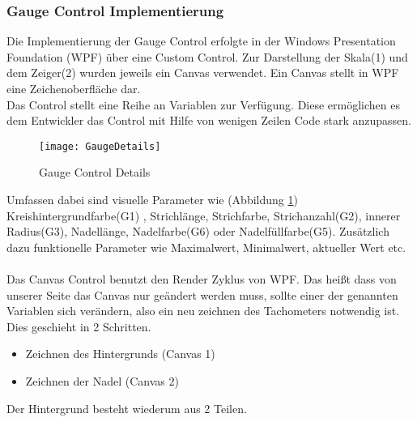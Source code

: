 \subsubsection{Gauge Control Implementierung}

Die Implementierung der Gauge Control erfolgte in der Windows Presentation Foundation (WPF) über eine Custom Control. Zur Darstellung der Skala(1) und dem Zeiger(2) wurden jeweils ein Canvas verwendet. Ein Canvas stellt in WPF eine Zeichenoberfläche dar.\\



Das Control stellt eine Reihe an Variablen zur Verfügung. Diese ermöglichen es dem Entwickler das Control mit Hilfe von wenigen Zeilen Code stark anzupassen. 
\begin{figure}[ht]
	\centering
	\texttt{[image: GaugeDetails]}
	\caption{Gauge Control Details}
	\label{fig:gauge1}
\end{figure}
Umfassen dabei sind visuelle Parameter wie (Abbildung \ref{fig:gauge1}) Kreishintergrundfarbe(G1) , Strichlänge, Strichfarbe, Strichanzahl(G2), innerer Radius(G3), Nadellänge, Nadelfarbe(G6) oder Nadelfüllfarbe(G5). Zusätzlich dazu funktionelle Parameter wie Maximalwert, Minimalwert, aktueller Wert etc.\\\\

Das Canvas Control benutzt den Render Zyklus von WPF. Das heißt dass von unserer Seite das Canvas nur geändert werden muss, sollte einer der genannten Variablen sich verändern, also ein neu zeichnen des Tachometers notwendig ist.\\
Dies geschieht in 2 Schritten. \\
\begin{itemize}
	\item Zeichnen des Hintergrunds (Canvas 1)
	\item Zeichnen der Nadel (Canvas 2)
\end{itemize}

Der Hintergrund besteht wiederum aus 2 Teilen. \\

